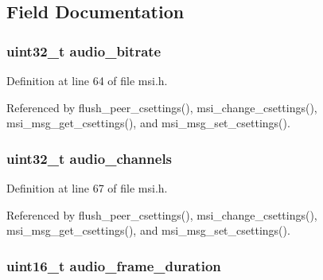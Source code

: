 \subsection{Field Documentation}
\hypertarget{struct___m_s_i_codec_settings_a5d9a8b59b2eb1eef8dbdcb032bf1dd01}{
\subsubsection[{audio\+\_\+bitrate}]{\setlength{\rightskip}{0pt plus 5cm}uint32\+\_\+t audio\+\_\+bitrate}}\label{struct___m_s_i_codec_settings_a5d9a8b59b2eb1eef8dbdcb032bf1dd01}


Definition at line 64 of file msi.\+h.



Referenced by flush\+\_\+peer\+\_\+csettings(), msi\+\_\+change\+\_\+csettings(), msi\+\_\+msg\+\_\+get\+\_\+csettings(), and msi\+\_\+msg\+\_\+set\+\_\+csettings().

\hypertarget{struct___m_s_i_codec_settings_a1b04e9669a2929f425e867440b6d826d}{
\subsubsection[{audio\+\_\+channels}]{\setlength{\rightskip}{0pt plus 5cm}uint32\+\_\+t audio\+\_\+channels}}\label{struct___m_s_i_codec_settings_a1b04e9669a2929f425e867440b6d826d}


Definition at line 67 of file msi.\+h.



Referenced by flush\+\_\+peer\+\_\+csettings(), msi\+\_\+change\+\_\+csettings(), msi\+\_\+msg\+\_\+get\+\_\+csettings(), and msi\+\_\+msg\+\_\+set\+\_\+csettings().

\hypertarget{struct___m_s_i_codec_settings_a61b592233f5a65705eb2600d38e365cd}{
\subsubsection[{audio\+\_\+frame\+\_\+duration}]{\setlength{\rightskip}{0pt plus 5cm}uint16\+\_\+t audio\+\_\+frame\+\_\+duration}}\label{struct___m_s_i_codec_settings_a61b592233f5a65705eb2600d38e365cd}


